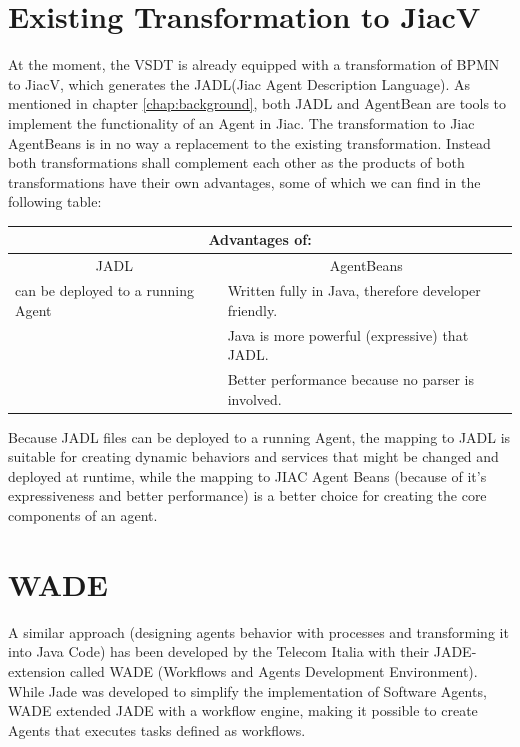 \section{Existing Transformation to JiacV}
At the moment, the VSDT is already equipped with a transformation of BPMN to JiacV, which generates the JADL(Jiac Agent Description Language).
As mentioned in chapter \ref{chap:background}, both JADL and AgentBean are tools to implement the functionality of an Agent in Jiac. 
The transformation to Jiac AgentBeans is in no way a replacement to the existing transformation. Instead both transformations shall complement each other as the products of both transformations have their own advantages, some of which we can find in the following table:
\begin{table}[htbp]
	\centering
		\begin{tabularx}{\linewidth}{|l|X|}\hline\hline
			\multicolumn{2}{|c|}{\textbf{Advantages of:}} \\\hline
			\multicolumn{1}{|c|}{JADL} & \multicolumn{1}{c|}{AgentBeans}\\\hline
			can be deployed to a running Agent &  Written fully in Java, therefore developer friendly.\\
																				 &  Java is more powerful (expressive) that JADL.\\
			                           				 &  Better performance because no parser is involved.\\\hline\hline
		\end{tabularx}
\end{table}
Because JADL files can be deployed to a running Agent, the mapping to JADL is suitable for creating dynamic behaviors and services that might be changed and deployed at runtime, while the mapping to JIAC Agent Beans (because of it's expressiveness and better performance) is a better choice for creating the core components of an agent. 
\newpage
\section{WADE}
\label{sec:wade}
A similar approach (designing agents behavior with processes and transforming it into Java Code) has been developed by the Telecom Italia with their JADE-extension called WADE (Workflows and Agents Development Environment). While Jade was developed to simplify the implementation of Software Agents, WADE extended JADE with a workflow engine, making it possible to create Agents that executes tasks defined as workflows.

